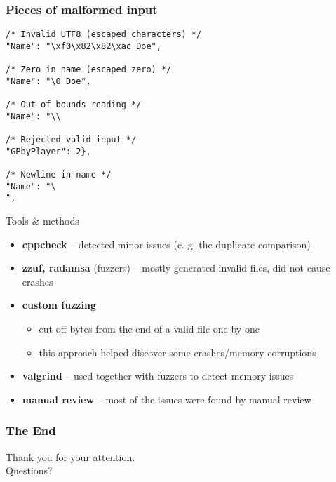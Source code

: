 \documentclass{beamer}
\begin{document}

\begin{frame}[fragile]
\frametitle{Pieces of malformed input}

\begin{lstlisting}[stringstyle=\color{black}]
/* Invalid UTF8 (escaped characters) */
"Name": "\xf0\x82\x82\xac Doe",

/* Zero in name (escaped zero) */
"Name": "\0 Doe",

/* Out of bounds reading */
"Name": "\\

/* Rejected valid input */
"GPbyPlayer": 2},

/* Newline in name */
"Name": "\
",
\end{lstlisting}

\end{frame}

\begin{frame}{Tools \& methods}
\begin{itemize}
\item \textbf{cppcheck} -- detected minor issues (e. g. the duplicate comparison)
\item \textbf{zzuf, radamsa} (fuzzers) -- mostly generated invalid files, did not cause crashes
\item \textbf{custom fuzzing}
	\begin{itemize}
	\item cut off bytes from the end of a valid file one-by-one
	\item this approach helped discover some crashes/memory corruptions
	\end{itemize}
\item \textbf{valgrind} -- used together with fuzzers to detect memory issues
\item \textbf{manual review} -- most of the issues were found by manual review
\end{itemize}
\end{frame}


\begin{frame}
\frametitle{The End}

\begin{center}
\begin{huge}
Thank you for your attention. \\
Questions?
\end{huge}
\end{center}

\end{frame}
\end{document}
